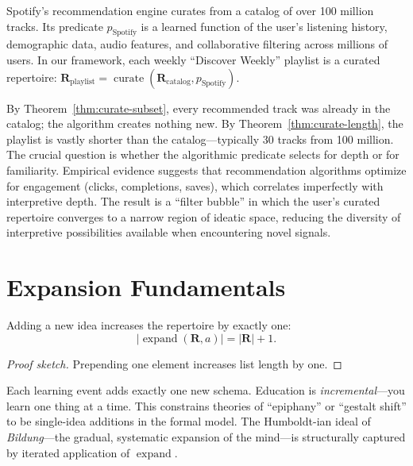 \begin{example}
\label{ex:spotify}
Spotify's recommendation engine curates from a catalog of over 100
million tracks.  Its predicate $p_{\text{Spotify}}$ is a learned function
of the user's listening history, demographic data, audio features, and
collaborative filtering across millions of users.  In our framework,
each weekly ``Discover Weekly'' playlist is a curated repertoire:
$\mathbf{R}_{\text{playlist}} = \operatorname{curate}(
\mathbf{R}_{\text{catalog}}, p_{\text{Spotify}})$.

By Theorem~\ref{thm:curate-subset}, every recommended track was already
in the catalog; the algorithm creates nothing new.  By
Theorem~\ref{thm:curate-length}, the playlist is vastly shorter than the
catalog---typically 30 tracks from 100 million.  The crucial question is
whether the algorithmic predicate selects for depth or for familiarity.
Empirical evidence suggests that recommendation algorithms optimize for
engagement (clicks, completions, saves), which correlates imperfectly
with interpretive depth.  The result is a ``filter bubble'' in which the
user's curated repertoire converges to a narrow region of ideatic space,
reducing the diversity of interpretive possibilities available when
encountering novel signals.
\end{example}

\section{Expansion Fundamentals}
\label{sec:ch15-expansion}

\begin{theorem}
\label{thm:expand-length}
Adding a new idea increases the repertoire by exactly one:
\[
  |\operatorname{expand}(\mathbf{R}, a)| = |\mathbf{R}| + 1.
\]
\end{theorem}

\begin{proof}[Proof sketch]
Prepending one element increases list length by one.
\end{proof}

Each learning event adds exactly one new schema.  Education is
\emph{incremental}---you learn one thing at a time.  This constrains
theories of ``epiphany'' or ``gestalt shift'' to be single-idea additions
in the formal model.  The Humboldt-ian ideal of \emph{Bildung}---the
gradual, systematic expansion of the mind---is structurally captured by
iterated application of $\operatorname{expand}$.

